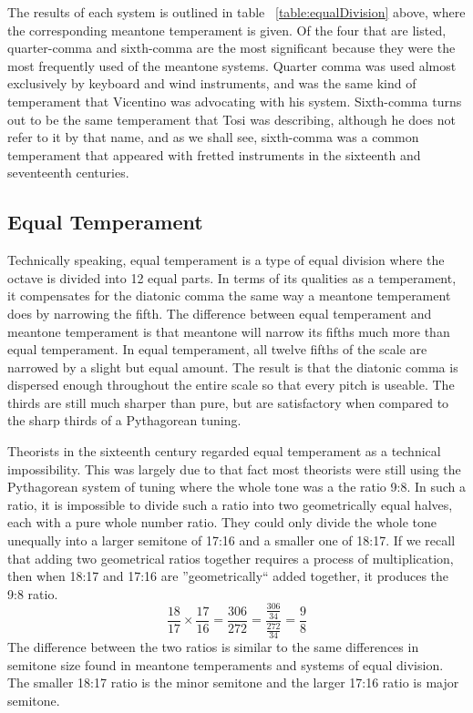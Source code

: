 The results of each system is outlined in table ~\ref{table:equalDivision} above, where
the corresponding meantone temperament is given.  Of the four that are listed, quarter-comma
and sixth-comma are the most significant because they were the most
frequently used of the meantone systems.  Quarter comma was used almost exclusively
by keyboard and wind instruments, and was the same kind of temperament that Vicentino was
advocating with his system. Sixth-comma turns out to be the same temperament that Tosi was
describing, although he does not refer to it by that name, and as we shall see, sixth-comma
was a common temperament that appeared with fretted instruments in the sixteenth and
seventeenth centuries.

\subsection{Equal Temperament}

Technically speaking, equal temperament is a type of equal division where the
octave is divided into 12 equal parts.  In terms of its qualities as a temperament,
it compensates for the diatonic comma the same way a meantone temperament does by
narrowing the fifth.  The difference between equal temperament and meantone
temperament is that meantone will narrow its fifths much more than equal
temperament.  In equal temperament, all twelve fifths of the scale are narrowed by a slight
but equal amount.  The result is that the diatonic comma is dispersed enough
throughout the entire scale so that every pitch is useable.  The thirds
are still much sharper than pure, but are satisfactory when compared to the sharp thirds
of a Pythagorean tuning.

Theorists in the sixteenth century regarded equal temperament as a technical impossibility.
This was largely due to that fact most theorists were still using the Pythagorean
system of tuning where the whole tone was a the ratio 9:8.  In such a ratio, it
is impossible to divide such a ratio into two geometrically equal halves, each with a pure
whole number ratio.
They could only divide the whole tone unequally into a larger semitone of 17:16
and a smaller one of 18:17. \autocite[20]{ML:1}  If we recall that adding two geometrical ratios
together requires a process of multiplication, then when 18:17 and 17:16 are ''geometrically``
added together, it produces the 9:8 ratio.
\begin{equation}
  \frac{18}{17} \times
  \frac{17}{16} =
  \frac{306}{272} =
  \frac{\frac{306}{34}}{\frac{272}{34}} =
  \frac{9}{8}
\end{equation}
The difference between the two ratios is similar to the same
differences in semitone size found in meantone temperaments and systems
of equal division.  The smaller 18:17 ratio is the minor semitone and the larger 17:16
ratio is major semitone.

